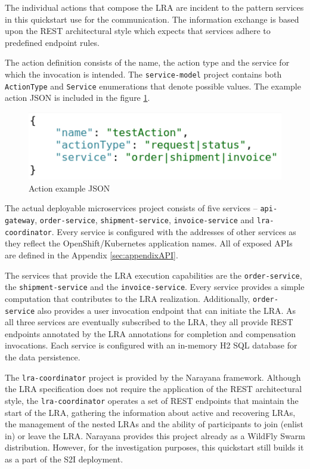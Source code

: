 \documentclass[oneside,
  digital, %
  table,   %
  lof,     %
  lot,     %
]{fithesis3}
\begin{document}
The individual actions that compose the LRA are incident to the pattern services in this quickstart use for the communication. The information exchange is based upon the REST architectural style which expects that services adhere to predefined endpoint rules. 

The action definition consists of the name, the action type and the service for which the invocation is intended. The \texttt{service-model} project contains both \texttt{ActionType} and \texttt{Service} enumerations that denote possible values. The example action JSON is included in the figure \ref{fig:action-json}.

\begin{figure}[h]
    \begin{center}
        \includegraphics[height=30mm]{images/actionJSON.png}
    \end{center}
    \caption{Action example JSON}
    \label{fig:action-json}
\end{figure}

The actual deployable microservices project consists of five services -- \texttt{api-gateway}, \texttt{order-service}, \texttt{shipment-service}, \texttt{invoice-service} and \texttt{lra-coordinator}. Every service is configured with the addresses of other services as they reflect the OpenShift/Kubernetes application names. All of exposed APIs are defined in the Appendix \ref{sec:appendixAPI}.

The services that provide the LRA execution capabilities are the \texttt{order-service}, the \texttt{shipment-service} and the \texttt{invoice-service}. Every service provides a simple computation that contributes to the LRA realization. Additionally, \texttt{order-service} also provides a user invocation endpoint that can initiate the LRA. As all three services are eventually subscribed to the LRA, they all provide REST endpoints annotated by the LRA annotations for completion and compensation invocations. Each service is configured with an in-memory H2 SQL database for the data persistence.

The \texttt{lra-coordinator} project is provided by the Narayana framework. Although the LRA specification does not require the application of the REST architectural style, the \texttt{lra-coordinator} operates a set of REST endpoints that maintain the start of the LRA, gathering the information about active and recovering LRAs, the management of the nested LRAs and the ability of participants to join (enlist in) or leave the LRA. Narayana provides this project already as a WildFly Swarm distribution. However, for the investigation purposes, this quickstart still builds it as a part of the S2I deployment.
\end{document}
